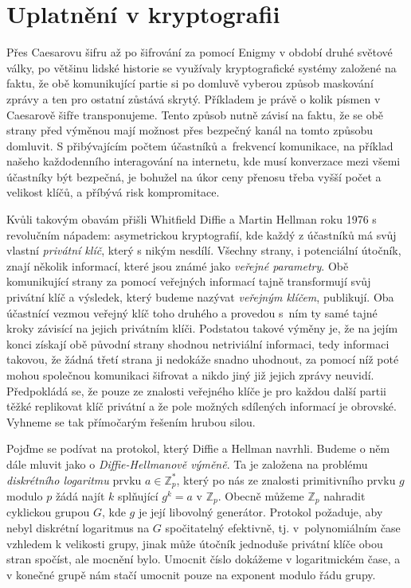 \documentclass[12pt]{report}
\begin{document}
\chapter{Uplatnění v kryptografii}

Přes Caesarovu šifru až po šifrování za pomocí Enigmy v období druhé světové války, po většinu lidské historie se využívaly kryptografické systémy založené na faktu, že obě komunikující partie si po domluvě vyberou způsob maskování zprávy a ten pro ostatní zůstává skrytý. Příkladem je právě o kolik písmen v Caesarově šifře transponujeme. Tento způsob nutně závisí na faktu, že se obě strany před výměnou mají možnost přes bezpečný kanál na tomto způsobu domluvit. S přibývajícím počtem účastníků a~frekvencí komunikace, na příklad našeho každodenního interagování na internetu, kde musí konverzace mezi všemi účastníky být bezpečná, je bohužel na úkor ceny přenosu třeba vyšší počet a velikost klíčů, a příbývá risk kompromitace.

Kvůli takovým obavám přišli Whitfield Diffie a Martin Hellman \cite{Diffie} roku 1976 s revolučním nápadem: asymetrickou kryptografií, kde každý z účastníků má svůj vlastní \textit{privátní klíč}, který s nikým nesdílí. Všechny strany, i potenciální útočník, znají několik informací, které jsou známé jako \textit{veřejné parametry}. Obě komunikující strany za pomocí veřejných informací tajně transformují svůj privátní klíč a výsledek, který budeme nazývat \textit{veřejným klíčem}, publikují. Oba účastnící vezmou veřejný klíč toho druhého a provedou s~ním ty samé tajné kroky závisící na jejich privátním klíči. Podstatou takové výměny je, že na jejím konci získají obě původní strany shodnou netriviální informaci, tedy informaci takovou, že žádná třetí strana ji nedokáže snadno uhodnout, za pomocí níž poté mohou společnou komunikaci šifrovat a nikdo jiný již jejich zprávy neuvidí. Předpokládá se, že pouze ze znalosti veřejného klíče je pro každou další partii těžké replikovat klíč privátní a že pole možných sdílených informací je obrovské. Vyhneme se tak přímočarým řešením hrubou silou.

Pojďme se podívat na protokol, který Diffie a Hellman navrhli. Budeme o něm dále mluvit jako o \textit{Diffie-Hellmanově výměně}. Ta je založena na problému \textit{diskrétního logaritmu} prvku $a \in \mathbb{Z}_p^{*}$, který po nás ze znalosti primitivního prvku $g$ modulo $p$ žádá najít $k$ splňující $g^k = a$ v $\mathbb{Z}_p$. Obecně můžeme $\mathbb{Z}_p$ nahradit cyklickou grupou $G$, kde $g$ je její libovolný generátor. Protokol požaduje, aby nebyl diskrétní logaritmus na $G$ spočitatelný efektivně, tj. v~polynomiálním čase vzhledem k velikosti grupy, jinak může útočník jednoduše privátní klíče obou stran spočíst, ale mocnění bylo. Umocnit číslo dokážeme v logaritmickém čase, a v konečné grupě nám stačí umocnit pouze na exponent modulo řádu grupy.
\end{document}
